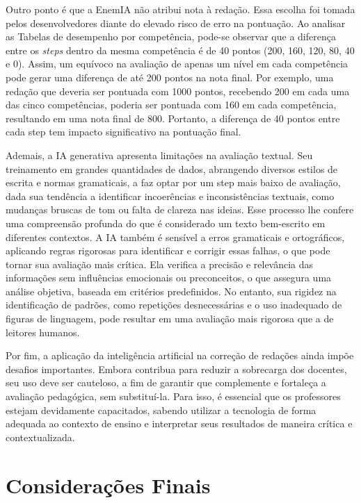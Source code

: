 \documentclass[portuguese]{textolivre}
\begin{document}
Outro ponto é que a EnemIA não atribui nota à redação. Essa escolha foi tomada pelos desenvolvedores diante do elevado risco de erro na pontuação. Ao analisar as Tabelas de desempenho por competência, pode-se observar que a diferença entre os \textit{steps} dentro da mesma competência é de 40 pontos (200, 160, 120, 80, 40 e 0). Assim, um equívoco na avaliação de apenas um nível em cada competência pode gerar uma diferença de até 200 pontos na nota final. Por exemplo, uma redação que deveria ser pontuada com 1000 pontos, recebendo 200 em cada uma das cinco competências, poderia ser pontuada com 160 em cada competência, resultando em uma nota final de 800. Portanto, a diferença de 40 pontos entre cada step tem impacto significativo na pontuação final.

Ademais, a IA generativa apresenta limitações na avaliação textual. Seu treinamento em grandes quantidades de dados, abrangendo diversos estilos de escrita e normas gramaticais, a faz optar por um step mais baixo de avaliação, dada sua tendência a identificar incoerências e inconsistências textuais, como mudanças bruscas de tom ou falta de clareza nas ideias. Esse processo lhe confere uma compreensão profunda do que é considerado um texto bem-escrito em diferentes contextos. A IA também é sensível a erros gramaticais e ortográficos, aplicando regras rigorosas para identificar e corrigir essas falhas, o que pode tornar sua avaliação mais crítica. Ela verifica a precisão e relevância das informações sem influências emocionais ou preconceitos, o que assegura uma análise objetiva, baseada em critérios predefinidos. No entanto, sua rigidez na identificação de padrões, como repetições desnecessárias e o uso inadequado de figuras de linguagem, pode resultar em uma avaliação mais rigorosa que a de leitores humanos. 

Por fim, a aplicação da inteligência artificial na correção de redações ainda impõe desafios importantes. Embora contribua para reduzir a sobrecarga dos docentes, seu uso deve ser cauteloso, a fim de garantir que complemente e fortaleça a avaliação pedagógica, sem substituí-la. Para isso, é essencial que os professores estejam devidamente capacitados, sabendo utilizar a tecnologia de forma adequada ao contexto de ensino e interpretar seus resultados de maneira crítica e contextualizada.

\section{Considerações Finais}\label{consideracoes}
\end{document}
